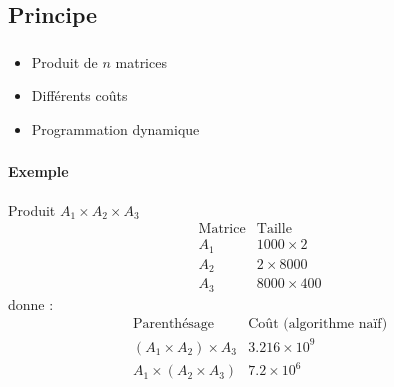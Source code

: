 \documentclass{beamer}
\begin{document}
\subsection{Principe}
\begin{frame}
  \frametitle{\insertsubsection}
  \begin{itemize}
  \item Produit de $n$ matrices
  \item Différents coûts
  \item Programmation dynamique
  \end{itemize}




\end{frame}

\begin{frame}
  \frametitle{\insertsubsection}
  \framesubtitle{Exemple}
  Produit $A_1 \times A_2 \times A_3$
  \[
  \begin{array}{cc} 
    \mbox{Matrice} & \mbox{Taille}\\
    A_1 & 1000 \times 2\\
    A_2 & 2 \times 8000\\
    A_3 & 8000 \times 400
  \end{array}
  \]
  donne :
  \[
  \begin{array}{cc}
    \mbox{Parenthésage} & \mbox{Coût (algorithme naïf)}\\
    (A_1 \times A_2) \times A_3 & 3.216 \times 10^9\\
    A_1 \times (A_2 \times A_3) & 7.2 \times 10^6
  \end{array}
  \]
\end{frame}
\end{document}
